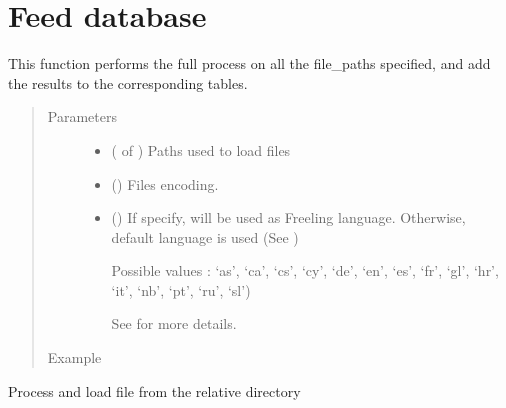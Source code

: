 \documentclass[letterpaper,10pt,english]{sphinxmanual}
\begin{document}
\section{Feed database}
\label{\detokenize{process:module-loacore.process.file_process}}\label{\detokenize{process:feed-database}}

\begin{fulllineitems}
\label{\detokenize{process:loacore.process.file_process.add_files}}
This function performs the full process on all the file\_paths specified, and add the results to the corresponding
tables.
\begin{quote}\begin{description}
\item[{Parameters}] \leavevmode\begin{itemize}
\item {} 
 ( of ) \textendash{} Paths used to load files

\item {} 
 () \textendash{} Files encoding.

\item {} 
 () \textendash{} 
If specify,  will be used as Freeling language.
Otherwise, default language is used (See )

Possible values : ‘as’, ‘ca’, ‘cs’, ‘cy’, ‘de’, ‘en’, ‘es’, ‘fr’, ‘gl’, ‘hr’, ‘it’, ‘nb’, ‘pt’, ‘ru’, ‘sl’)

See  for more details.


\end{itemize}

\item[{Example}] \leavevmode
\end{description}\end{quote}

Process and load file from the relative directory 


\end{fulllineitems}
\end{document}
